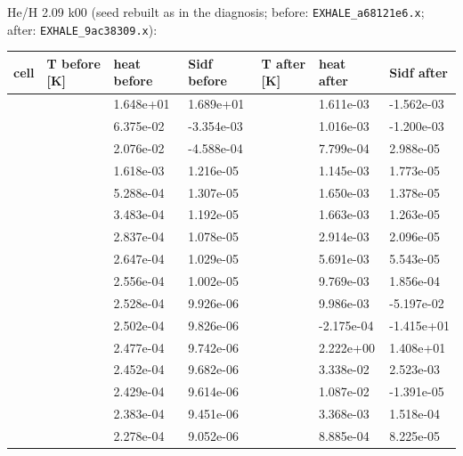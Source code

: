 \documentclass[english,a4paper]{my_memo}
\begin{document}
He/H 2.09 k00 (seed rebuilt as in the diagnosis; before: \texttt{EXHALE\_a68121e6.x}; after: \texttt{EXHALE\_9ac38309.x}):

{\def\LTcaptype{none} %
{\small
\begin{longtable}[]{@{}>{\raggedright\arraybackslash}p{\dimexpr(\linewidth-14\tabcolsep)/7\relax}>{\raggedright\arraybackslash}p{\dimexpr(\linewidth-14\tabcolsep)/7\relax}>{\raggedright\arraybackslash}p{\dimexpr(\linewidth-14\tabcolsep)/7\relax}>{\raggedright\arraybackslash}p{\dimexpr(\linewidth-14\tabcolsep)/7\relax}>{\raggedright\arraybackslash}p{\dimexpr(\linewidth-14\tabcolsep)/7\relax}>{\raggedright\arraybackslash}p{\dimexpr(\linewidth-14\tabcolsep)/7\relax}>{\raggedright\arraybackslash}p{\dimexpr(\linewidth-14\tabcolsep)/7\relax}@{}}
\toprule\noalign{}
cell & T before {[}K{]} & heat before & Sidf before & T after {[}K{]} & heat after & Sidf after \\
\midrule\noalign{}
\endhead
\bottomrule\noalign{}
\endlastfoot
1 & 57.4 & 1.648e+01 & 1.689e+01 & 354.5 & 1.611e-03 & -1.562e-03 \\
2 & 209.8 & 6.375e-02 & -3.354e-03 & 436.6 & 1.016e-03 & -1.200e-03 \\
3 & 269.1 & 2.076e-02 & -4.588e-04 & 508.2 & 7.799e-04 & 2.988e-05 \\
10 & 459.6 & 1.618e-03 & 1.216e-05 & 885.5 & 1.145e-03 & 1.773e-05 \\
20 & 613.5 & 5.288e-04 & 1.307e-05 & 1260.5 & 1.650e-03 & 1.378e-05 \\
30 & 729.9 & 3.483e-04 & 1.192e-05 & 1545.6 & 1.663e-03 & 1.263e-05 \\
40 & 826.9 & 2.837e-04 & 1.078e-05 & 1809.1 & 2.914e-03 & 2.096e-05 \\
45 & 870.3 & 2.647e-04 & 1.029e-05 & 1998.5 & 5.691e-03 & 5.543e-05 \\
48 & 895.0 & 2.556e-04 & 1.002e-05 & 2205.1 & 9.769e-03 & 1.856e-04 \\
49 & 903.1 & 2.528e-04 & 9.926e-06 & 2317.1 & 9.986e-03 & -5.197e-02 \\
50 & 911.0 & 2.502e-04 & 9.826e-06 & 2470.7 & -2.175e-04 & -1.415e+01 \\
51 & 918.9 & 2.477e-04 & 9.742e-06 & 60.6 & 2.222e+00 & 1.408e+01 \\
52 & 926.8 & 2.452e-04 & 9.682e-06 & 170.2 & 3.338e-02 & 2.523e-03 \\
53 & 934.7 & 2.429e-04 & 9.614e-06 & 223.7 & 1.087e-02 & -1.391e-05 \\
55 & 950.7 & 2.383e-04 & 9.451e-06 & 297.6 & 3.368e-03 & 1.518e-04 \\
60 & 991.3 & 2.278e-04 & 9.052e-06 & 429.2 & 8.885e-04 & 8.225e-05 \\
\end{longtable}
}
}
\end{document}
